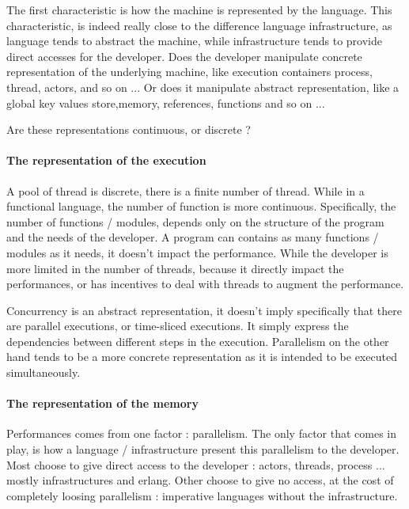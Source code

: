 The first characteristic is how the machine is represented by the language.
This characteristic, is indeed really close to the difference language infrastructure, as language tends to abstract the machine, while infrastructure tends to provide direct accesses for the developer.
Does the developer manipulate concrete representation of the underlying machine, like execution containers process, thread, actors, and so on ...
Or does it manipulate abstract representation, like a global key values store,memory, references, functions and so on ...

Are these representations continuous, or discrete ?

\paragraph{The representation of the execution}
A pool of thread is discrete, there is a finite number of thread.
While in a functional language, the number of function is more continuous.
Specifically, the number of functions / modules, depends only on the structure of the program and the needs of the developer.
A program can contains as many functions / modules as it needs, it doesn't impact the performance.
While the developer is more limited in the number of threads, because it directly impact the performances, or has incentives to deal with threads to augment the performance.

Concurrency is an abstract representation, it doesn't imply specifically that there are parallel executions, or time-sliced executions.
It simply express the dependencies between different steps in the execution.
Parallelism on the other hand tends to be a more concrete representation as it is intended to be executed simultaneously.

\paragraph{The representation of the memory}







Performances comes from one factor : parallelism.
The only factor that comes in play, is how a language / infrastructure present this parallelism to the developer.
Most choose to give direct access to the developer : actors, threads, process ... mostly infrastructures and erlang.
Other choose to give no access, at the cost of completely loosing parallelism : imperative languages without the infrastructure.

